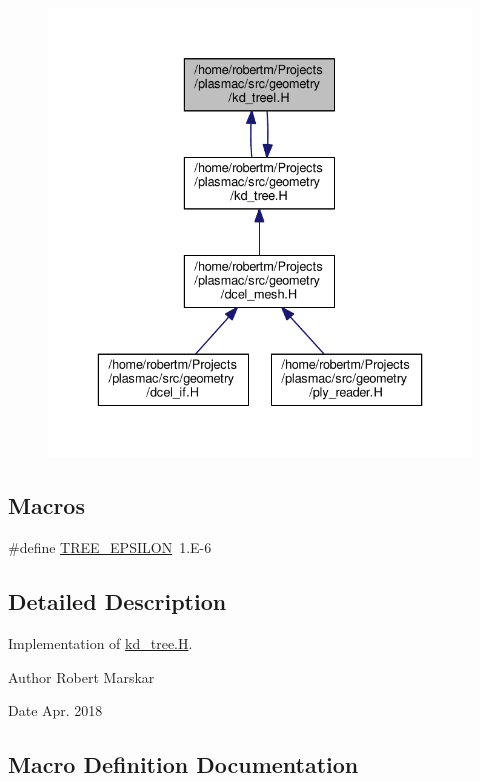 \begin{figure}[H]
\begin{center}
\leavevmode
\includegraphics[width=336pt]{kd__treeI_8H__dep__incl}
\end{center}
\end{figure}
\subsection*{Macros}
\begin{DoxyCompactItemize}
\item 
\#define \hyperlink{kd__treeI_8H_afe99b560aeec747790acc006750d892d}{T\+R\+E\+E\+\_\+\+E\+P\+S\+I\+L\+ON}~1.E-\/6
\end{DoxyCompactItemize}


\subsection{Detailed Description}
Implementation of \hyperlink{kd__tree_8H}{kd\+\_\+tree.\+H}. 

\begin{DoxyAuthor}{Author}
Robert Marskar 
\end{DoxyAuthor}
\begin{DoxyDate}{Date}
Apr. 2018 
\end{DoxyDate}


\subsection{Macro Definition Documentation}
